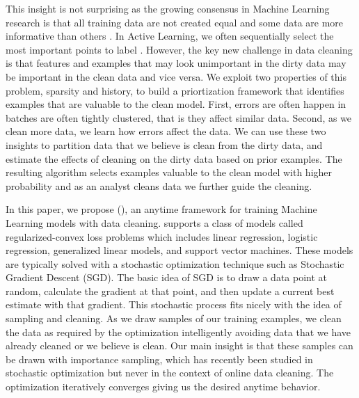 This insight is not surprising as the growing consensus in Machine Learning research is that all training data are not created equal and some data are more informative than others \cite{drineas2012fast, settles2010active}.
In Active Learning, we often sequentially select the most important points to label \cite{settles2010active}.
However, the key new challenge in data cleaning is that features and examples that may look unimportant in the dirty data may be important in the clean data and vice versa.
We exploit two properties of this problem, sparsity and history, to build a priortization framework that identifies examples that are valuable to the clean model.
First, errors are often happen in batches are often tightly clustered, that is they affect similar data.
Second, as we clean more data, we learn how errors affect the data.
We can use these two insights to partition data that we believe is clean from the dirty data, and estimate the effects of cleaning on the dirty data based on prior examples.
The resulting algorithm selects examples valuable to the clean model with higher probability and as an analyst cleans data we further guide the cleaning.

In this paper, we propose \sysfull (\sys), an anytime framework for training Machine Learning models with data cleaning.
\sys supports a class of models called regularized-convex loss problems which includes linear regression, logistic regression, generalized linear models, and support vector machines.
These models are typically solved with a stochastic optimization technique such as Stochastic Gradient Descent (SGD).
The basic idea of SGD is to draw a data point at random, calculate the gradient at that point, and then update a current best estimate with that gradient.
This stochastic process fits nicely with the idea of sampling and cleaning.
As we draw samples of our training examples, we clean the data as required by the optimization intelligently avoiding data that we have already cleaned or we believe is clean.
Our main insight is that these samples can be drawn with importance sampling, which has recently been studied in stochastic optimization \cite{zhao2014stochastic} but never in the context of online data cleaning. 
The optimization iteratively converges giving us the desired anytime behavior.

